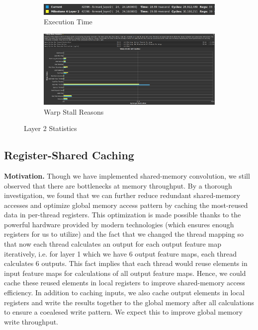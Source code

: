 \documentclass{article}
\begin{document}
\begin{figure}[H]
    \centering
    \begin{subfigure}[b]{\linewidth}
        \includegraphics[width=\linewidth]{pragma_layer2_summary}
        \caption{Execution Time}
    \end{subfigure}
    \begin{subfigure}[b]{\linewidth}
        \includegraphics[width=\linewidth]{pragma_layer2_warp}
        \caption{Warp Stall Reasons}
    \end{subfigure}
    \caption{Layer 2 Statistics}
\end{figure}

\subsection{Register-Shared Caching}
\textbf{Motivation.} Though we have implemented shared-memory convolution,
we still observed that there are bottlenecks at memory throughput. By a thorough
investigation, we found that we can further reduce redundant shared-memory accesses
and optimize global memory access pattern by caching the most-reused data in
per-thread registers. This optimization is made possible thanks to the powerful
hardware provided by modern technologies (which ensures enough registers for us to
utilize) and the fact that we changed the thread mapping so that now each thread
calculates an output for each output feature map iteratively, i.e. for layer 1 which
we have 6 output feature maps, each thread calculates 6 outputs. This fact implies
that each thread would reuse elements in input feature maps for calculations of all
output feature maps. Hence, we could cache these reused elements in local registers
to improve shared-memory access efficiency. In addition to caching inputs, we also
cache output elements in local registers and write the results together to the
global memory after all calculations to ensure a coealesed write pattern. We expect
this to improve global memory write throughput.\\
\end{document}
